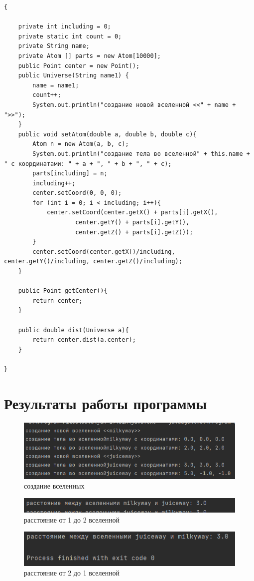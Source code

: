 ﻿\documentclass[a4paper, 12pt]{extarticle}
\begin{document}
\begin{verbatim}
{

    private int including = 0;
    private static int count = 0;
    private String name;
    private Atom [] parts = new Atom[10000];
    public Point center = new Point();
    public Universe(String name1) {
        name = name1;
        count++;
        System.out.println("создание новой вселенной <<" + name + ">>");
    }
    public void setAtom(double a, double b, double c){
        Atom n = new Atom(a, b, c);
        System.out.println("создание тела во вселенной" + this.name + " с координатами: " + a + ", " + b + ", " + c);
        parts[including] = n;
        including++;
        center.setCoord(0, 0, 0);
        for (int i = 0; i < including; i++){
            center.setCoord(center.getX() + parts[i].getX(),
                    center.getY() + parts[i].getY(),
                    center.getZ() + parts[i].getZ());
        }
        center.setCoord(center.getX()/including, center.getY()/including, center.getZ()/including);
    }

    public Point getCenter(){
        return center;
    }

    public double dist(Universe a){
        return center.dist(a.center);
    }

}
\end{verbatim}

\section{Результаты работы программы}
\begin{figure}[H]
    \centering
    \includegraphics[width=\linewidth]{Test.png}
    \caption{создание вселенных}
    \label{fig:my_label}
\end{figure}

\begin{figure}[H]
    \centering
    \includegraphics[width=\linewidth]{Test1.png}
    \caption{расстояние от 1 до 2 вселенной}
    \label{fig:my_label}
\end{figure}

\begin{figure}[H]
    \centering
    \includegraphics[width=\linewidth]{Test2.png}
    \caption{расстояние от 2 до 1 вселенной}
    \label{fig:my_label}
\end{figure}
\end{document}
